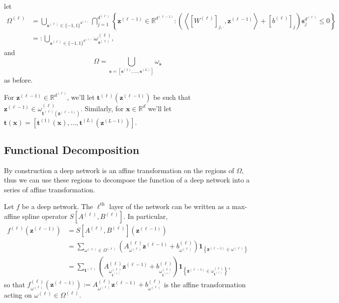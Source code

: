 let \begin{align}\label{eq:layer_partition_relu}
    \Omega^{(\ell)}&=\bigcup_{\mathbf{s}^{(\ell)}\in\{-1,1\}^{d^{(\ell)}}}\bigcap_{j=1}^{d^{(\ell)}}\left\{\mathbf{z}^{(\ell-1)}\in\mathbb{R}^{d^{(\ell-1)}}:\left(\left\langle\left[W^{(\ell)}\right]_{j,\cdot},\mathbf{z}^{(\ell-1)}\right\rangle+\left[b^{(\ell)}\right]_j\right)\mathbf{s}^{d^{(\ell)}}_j\leq0\right\}\nonumber\\&=:\bigcup_{\mathbf{s}^{(\ell)}\in\{-1,1\}^{d^{(\ell)}}}\omega^{(\ell)}_{\mathbf{s}^{(\ell)}},
\end{align}
and $$\Omega=\bigcup_{\mathbf{s}=\left[\mathbf{s}^{(1)},\dots,\mathbf{s}^{(L)}\right]}\omega_{\mathbf{s}}$$as before.

\begin{remark}
    For $\mathbf{z}^{(\ell-1)}\in\mathbb{R}^{d^{(\ell)}}$, we'll let $\mathbf{t}^{(\ell)}\left(\mathbf{z}^{(\ell-1)}\right)$ be such that $\mathbf{z}^{(\ell-1)}\in\omega^{(\ell)}_{\mathbf{t}^{(\ell)}\left(\mathbf{z}^{(\ell-1)}\right)}$. Similarly, for $\mathbf{x}\in\mathbb{R}^d$ we'll let $\mathbf{t}(\mathbf{x})=\left[\mathbf{t}^{(1)}\left(\mathbf{x}\right),\dots,\mathbf{t}^{(L)}\left(\mathbf{z}^{(L-1)}\right)\right]$.
\end{remark}

\subsection{Functional Decomposition}

By construction a deep network is an affine transformation on the regions of $\Omega$, thus we can use these regions to decompose the function of a deep network into a series of affine transformation.

Let $f$ be a deep network. The $\ell^\text{th}$ layer of the network can be written as a max-affine spline operator $S\left[A^{(\ell)},B^{(\ell)}\right]$. In particular, 
\begin{align}\label{eq:functional_decomposition_layer_operator}
    f^{(\ell)}\left(\mathbf{z}^{(\ell-1)}\right)&=S\left[A^{(\ell)},B^{(\ell)}\right]\left(\mathbf{z}^{(\ell-1)}\right)\nonumber\\&=\sum_{\omega^{(\ell)}\in\Omega^{(\ell)}}\left(A_{\omega^{(\ell)}}^{(\ell)}\mathbf{z}^{(\ell-1)}+b_{\omega^{(\ell)}}^{(\ell)}\right)\mathbf{1}_{\left\{\mathbf{z}^{(\ell-1)}\in\omega^{(\ell)}\right\}}\nonumber\\&=\sum_{\mathbf{t}^{(\ell)}}\left(A_{\omega^{(\ell)}_{\mathbf{t}^{(\ell)}}}^{(\ell)}\mathbf{z}^{(\ell-1)}+b_{\omega^{(\ell)}_{\mathbf{t}^{(\ell)}}}^{(\ell)}\right)\mathbf{1}_{\left\{\mathbf{z}^{(\ell-1)}\in\omega^{(\ell)}_{\mathbf{t}^{(\ell)}}\right\}},
\end{align}
so that $f_{\omega^{(\ell)}}^{(\ell)}\left(\mathbf{z}^{(\ell-1)}\right):=A_{\omega^{(\ell)}}^{(\ell)}\mathbf{z}^{(\ell-1)}+b_{\omega^{(\ell)}}^{(\ell)}$ is the affine transformation acting on $\omega^{(\ell)}\in\Omega^{(\ell)}$.

